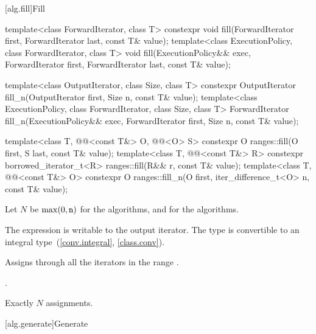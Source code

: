 [alg.fill]{Fill}

%
%
\begin{itemdecl}
template<class ForwardIterator, class T>
  constexpr void fill(ForwardIterator first, ForwardIterator last, const T& value);
template<class ExecutionPolicy, class ForwardIterator, class T>
  void fill(ExecutionPolicy&& exec,
            ForwardIterator first, ForwardIterator last, const T& value);

template<class OutputIterator, class Size, class T>
  constexpr OutputIterator fill_n(OutputIterator first, Size n, const T& value);
template<class ExecutionPolicy, class ForwardIterator, class Size, class T>
  ForwardIterator fill_n(ExecutionPolicy&& exec,
                         ForwardIterator first, Size n, const T& value);


template<class T, @@<const T&> O, @@<O> S>
  constexpr O ranges::fill(O first, S last, const T& value);
template<class T, @@<const T&> R>
  constexpr borrowed_iterator_t<R> ranges::fill(R&& r, const T& value);
template<class T, @@<const T&> O>
  constexpr O ranges::fill_n(O first, iter_difference_t<O> n, const T& value);
\end{itemdecl}

\begin{itemdescr}
\pnum
Let $N$ be $\max(0, \texttt{n})$ for the  algorithms, and
 for the  algorithms.

\pnum
\mandates
The expression 
is writable to the output iterator.
The type  is convertible
to an integral type~(\ref{conv.integral}, \ref{class.conv}).

\pnum
\effects
Assigns 
through all the iterators in the range .

\pnum
\returns
{}.

\pnum
\complexity
Exactly $N$ assignments.
\end{itemdescr}

[alg.generate]{Generate}

